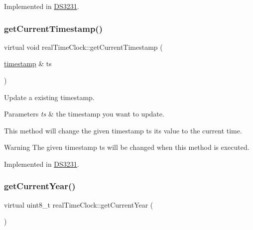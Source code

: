 Implemented in \mbox{\hyperlink{class_d_s3231_a04e087a918d2d48b0cdd2e3c6c2f595f}{D\+S3231}}.

\mbox{\label{classreal_time_clock_aa7402c5941b089d4e86b2af20d48b7ba}} 
\subsubsection{\texorpdfstring{get\+Current\+Timestamp()}{getCurrentTimestamp()}\hspace{0.1cm}{\footnotesize\ttfamily [2/2]}}
{\footnotesize\ttfamily virtual void real\+Time\+Clock\+::get\+Current\+Timestamp (\begin{DoxyParamCaption}\item[{\mbox{\hyperlink{classtimestamp}{timestamp}} \&}]{ts }\end{DoxyParamCaption})\hspace{0.3cm}{\ttfamily [pure virtual]}}



Update a existing timestamp. 


\begin{DoxyParams}{Parameters}
{\em ts} & the timestamp you want to update.\\
\hline
\end{DoxyParams}
This method will change the given timestamp ts its value to the current time. \begin{DoxyWarning}{Warning}
The given timestamp ts will be changed when this method is executed. 
\end{DoxyWarning}


Implemented in \mbox{\hyperlink{class_d_s3231_ad94d54ed265fb5b911b4281f0103b0b0}{D\+S3231}}.

\mbox{\label{classreal_time_clock_a0cb99c34e2d6a089a62c8bea760c5add}} 
\subsubsection{\texorpdfstring{get\+Current\+Year()}{getCurrentYear()}}
{\footnotesize\ttfamily virtual uint8\+\_\+t real\+Time\+Clock\+::get\+Current\+Year (\begin{DoxyParamCaption}{ }\end{DoxyParamCaption})\hspace{0.3cm}{\ttfamily [pure virtual]}}



